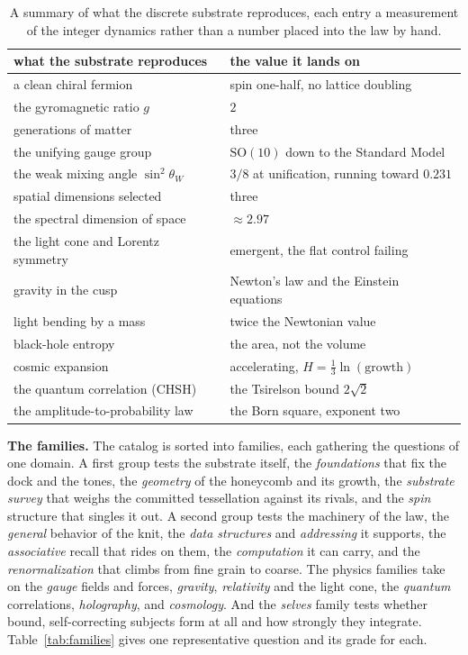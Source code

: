 \begin{table}[ht]
\centering
\small
\begin{tabular}{@{}ll@{}}
\toprule
what the substrate reproduces & the value it lands on \\
\midrule
a clean chiral fermion & spin one-half, no lattice doubling \\
the gyromagnetic ratio $g$ & $2$ \\
generations of matter & three \\
the unifying gauge group & $\mathrm{SO}(10)$ down to the Standard Model \\
the weak mixing angle $\sin^2\theta_W$ & $3/8$ at unification, running toward $0.231$ \\
spatial dimensions selected & three \\
the spectral dimension of space & $\approx 2.97$ \\
the light cone and Lorentz symmetry & emergent, the flat control failing \\
gravity in the cusp & Newton's law and the Einstein equations \\
light bending by a mass & twice the Newtonian value \\
black-hole entropy & the area, not the volume \\
cosmic expansion & accelerating, $H = \tfrac{1}{3}\ln(\text{growth})$ \\
the quantum correlation (CHSH) & the Tsirelson bound $2\sqrt 2$ \\
the amplitude-to-probability law & the Born square, exponent two \\
\bottomrule
\end{tabular}
\caption{A summary of what the discrete substrate reproduces, each entry a measurement of the integer dynamics rather than a number placed into the law by hand.}
\label{tab:reproduced}
\end{table}

\textbf{The families.} The catalog is sorted into families, each gathering the questions of one domain. A first group tests the substrate itself, the \textit{foundations} that fix the dock and the tones, the \textit{geometry} of the honeycomb and its growth, the \textit{substrate survey} that weighs the committed tessellation against its rivals, and the \textit{spin} structure that singles it out. A second group tests the machinery of the law, the \textit{general} behavior of the knit, the \textit{data structures} and \textit{addressing} it supports, the \textit{associative} recall that rides on them, the \textit{computation} it can carry, and the \textit{renormalization} that climbs from fine grain to coarse. The physics families take on the \textit{gauge} fields and forces, \textit{gravity}, \textit{relativity} and the light cone, the \textit{quantum} correlations, \textit{holography}, and \textit{cosmology}. And the \textit{selves} family tests whether bound, self-correcting subjects form at all and how strongly they integrate. Table~\ref{tab:families} gives one representative question and its grade for each.

